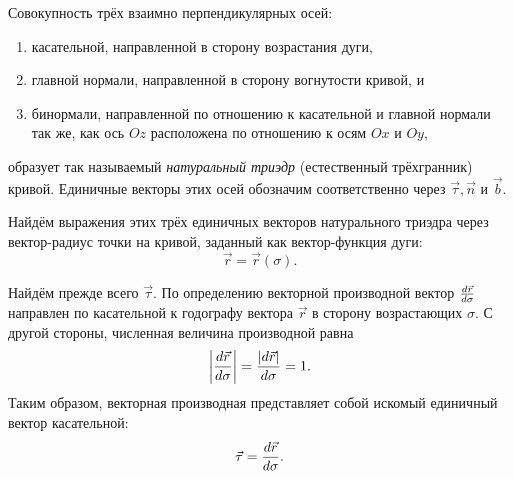 \begin{definition}
  Совокупность трёх взаимно перпендикулярных осей:
  \begin{enumerate}
    \item касательной, направленной в сторону возрастания дуги,
    \item главной нормали, направленной в сторону вогнутости кривой, и
    \item бинормали, направленной по отношению к касательной и главной нормали
      так же, как ось $Oz$ расположена по отношению к осям $Ox$ и $Oy$,
  \end{enumerate}
  образует так называемый \textit{натуральный триэдр}
  (естественный трёхгранник) кривой. Единичные векторы этих осей обозначим
  соответственно через $\vec{\tau}, \vec{n}$ и $\vec{b}$.
\end{definition}

Найдём выражения этих трёх единичных векторов натурального триэдра через
вектор-радиус точки на кривой, заданный как вектор-функция дуги:
\begin{equation}
  \vec{r} = \vec{r}(\sigma).
\end{equation}

Найдём прежде всего $\vec{\tau}$. По определению векторной производной вектор
$\der[\vec{r}]{\sigma}$ направлен по касательной к годографу вектора $\vec{r}$
в сторону возрастающих $\sigma$. С другой стороны, численная величина
производной равна
\begin{equation*}
  \abs{\der[\vec{r}]{\sigma}} = \frac{\abs{d \vec{r}}}{d \sigma} = 1.
\end{equation*}
Таким образом, векторная производная представляет собой искомый единичный
вектор касательной:
\begin{equation}
  \vec{\tau} = \der[\vec{r}]{\sigma}.
\end{equation}

